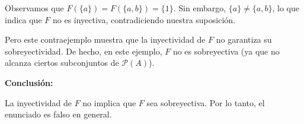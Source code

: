 \begin{solution}
\begin{enumerate}
        Observamos que \( F(\{a\}) = F(\{a, b\}) = \{1\} \). Sin embargo, \( \{a\} \neq \{a, b\} \), lo que indica que \( F \) no es inyectiva, contradiciendo nuestra suposición.
        
        Pero este contraejemplo muestra que la inyectividad de \( F \) no garantiza su sobreyectividad. De hecho, en este ejemplo, \( F \) no es sobreyectiva (ya que no alcanza ciertos subconjuntos de \( \mathcal{P}(A) \)).
        
        \textbf{Conclusión:}
        
        La inyectividad de \( F \) no implica que \( F \) sea sobreyectiva. Por lo tanto, el enunciado es falso en general.
    \end{enumerate}
\end{solution}